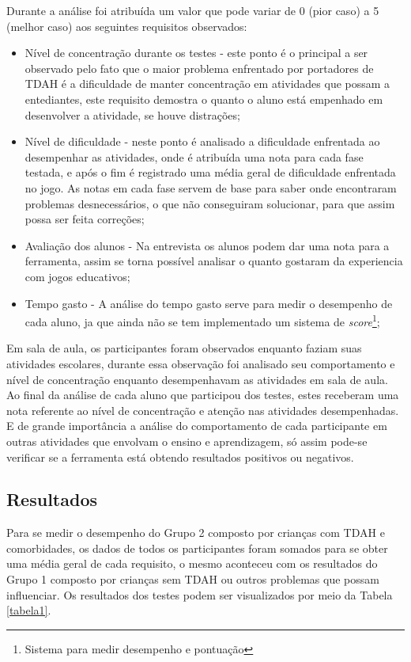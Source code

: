 \documentclass[
	12pt,				%
    oneside,			%
	a4paper,			%
	english,			%
	french,				%
	spanish,			%
	brazil,				%
	]{abntex2}
\begin{document}
			Durante a análise foi atribuída um valor que pode variar de 0 (pior caso) a 5 (melhor caso) aos seguintes requisitos observados: 
			\begin{itemize}
				\item Nível de concentração durante os testes -  este ponto é o principal a ser observado pelo fato que o maior problema enfrentado por portadores de TDAH é a dificuldade de manter concentração em atividades que possam a entediantes, este requisito demostra o quanto o aluno está empenhado em desenvolver a atividade, se houve distrações;
				
				\item Nível de dificuldade - neste ponto é analisado a dificuldade enfrentada ao desempenhar as atividades, onde é atribuída uma nota para cada fase testada, e após o fim é registrado uma média geral de dificuldade enfrentada no jogo. As notas em cada fase servem de base para saber onde encontraram problemas desnecessários, o que não conseguiram solucionar, para que assim possa ser feita correções;
				
				\item Avaliação dos alunos - Na entrevista os alunos podem dar uma nota para a ferramenta, assim se torna possível analisar o quanto gostaram da experiencia com jogos educativos;
				
				\item Tempo gasto - A análise do tempo gasto serve para medir o desempenho de cada aluno, ja que ainda não se tem implementado um sistema de \textit{score}\footnote{Sistema para medir desempenho e pontuação};
			\end{itemize}
		
		Em sala de aula, os participantes foram observados enquanto faziam suas atividades escolares, durante essa observação foi analisado seu comportamento e nível de concentração enquanto desempenhavam as atividades em sala de aula. Ao final da análise de cada aluno que participou dos testes, estes receberam uma nota referente ao nível de concentração e atenção nas atividades desempenhadas. E de grande importância a análise do comportamento de cada participante em outras atividades que envolvam o ensino e aprendizagem, só assim pode-se verificar se a ferramenta está obtendo resultados positivos ou negativos.
	\subsection{Resultados}
			 
	Para se medir o desempenho do Grupo 2 composto por crianças com TDAH e comorbidades, os dados de todos os participantes foram somados para se obter uma média geral de cada requisito, o mesmo aconteceu com os resultados do Grupo 1 composto por crianças sem TDAH ou outros problemas que possam influenciar. Os resultados dos testes podem ser visualizados por meio da Tabela \ref*{tabela1}.
		
\end{document}

